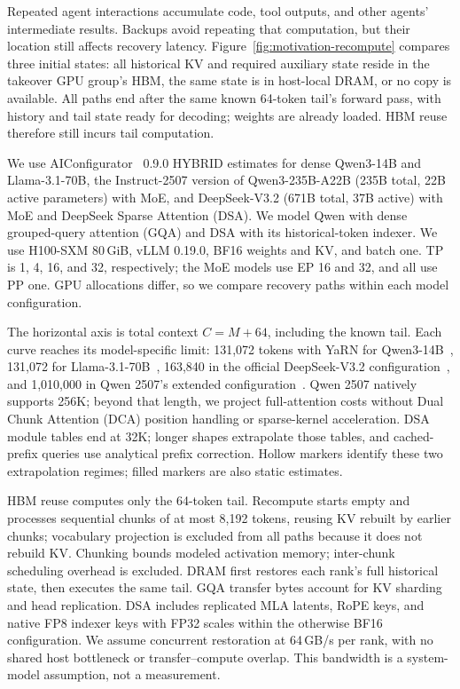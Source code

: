 

Repeated agent interactions accumulate code, tool outputs, and other
agents' intermediate results. Backups avoid repeating that computation,
but their location still affects recovery latency.
Figure~\ref{fig:motivation-recompute} compares three initial states:
all historical KV and required auxiliary state reside in the takeover
GPU group's HBM, the same state is in host-local DRAM, or no copy is
available. All paths end after the same known 64-token tail's forward
pass, with history and tail state ready for decoding; weights are
already loaded. HBM reuse therefore still incurs tail computation.

We use AIConfigurator~\cite{nvidia2026aiconfigurator} 0.9.0 HYBRID estimates
for dense Qwen3-14B and Llama-3.1-70B, the Instruct-2507 version of
Qwen3-235B-A22B (235B total, 22B active parameters) with MoE, and DeepSeek-V3.2
(671B total, 37B active) with MoE and DeepSeek Sparse Attention (DSA).
We model Qwen with dense grouped-query attention (GQA) and DSA with its
historical-token indexer. We use
H100-SXM 80\,GiB, vLLM 0.19.0, BF16 weights and KV, and batch one.
TP is 1, 4, 16, and 32, respectively; the MoE models use EP 16 and 32,
and all use PP one. GPU allocations differ, so we compare recovery
paths within each model configuration.

The horizontal axis is total context $C=M+64$, including the known tail.
Each curve reaches its model-specific limit: 131,072 tokens with YaRN
for Qwen3-14B~\cite{qwen2025technical}, 131,072 for
Llama-3.1-70B~\cite{meta2024llama31card}, 163,840 in the official
DeepSeek-V3.2 configuration~\cite{deepseek2025v32config}, and 1,010,000
in Qwen 2507's extended configuration~\cite{qwen2025instruct2507}.
Qwen 2507 natively supports 256K; beyond that length, we project
full-attention costs without Dual Chunk Attention (DCA) position handling
or sparse-kernel acceleration. DSA module tables end at 32K; longer
shapes extrapolate those tables, and cached-prefix queries use analytical
prefix correction. Hollow markers identify these two extrapolation
regimes; filled markers are also static estimates.

HBM reuse computes only the 64-token tail. Recompute starts empty and
processes sequential chunks of at most 8,192 tokens, reusing KV rebuilt
by earlier chunks; vocabulary projection is excluded
from all paths because it does not rebuild KV. Chunking bounds modeled
activation memory; inter-chunk scheduling overhead is excluded.
DRAM first restores each rank's full historical
state, then executes the same tail. GQA transfer bytes account for KV
sharding and head replication. DSA includes replicated MLA latents,
RoPE keys, and native FP8 indexer keys with FP32 scales within the
otherwise BF16 configuration. We assume concurrent restoration at
64\,GB/s per rank, with no shared host bottleneck or transfer--compute
overlap. This bandwidth is a system-model assumption, not a measurement.

